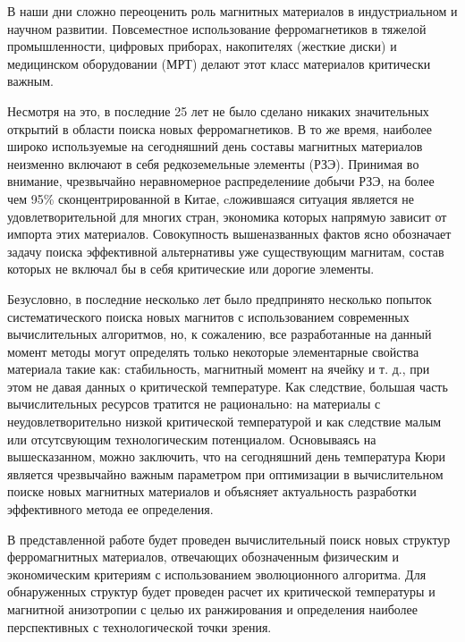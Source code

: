 В наши дни сложно переоценить роль магнитных материалов в индустриальном и научном развитии. Повсеместное использование ферромагнетиков в тяжелой промышленности, цифровых приборах, накопителях (жесткие диски) и медицинском оборудовании (МРТ) делают этот класс материалов критически важным.

Несмотря на это, в последние 25 лет не было сделано никаких значительных открытий в области поиска новых ферромагнетиков. В то же время, наиболее широко используемые на сегодняшний день составы магнитных материалов неизменно включают в себя редкоземельные элементы (РЗЭ).  Принимая во внимание, чрезвычайно неравномерное распределениие добычи РЗЭ,  на более чем 95\% сконцентрированной в Китае, cложившаяся ситуация является не удовлетворительной для многих стран, экономика которых напрямую зависит от импорта этих материалов.
Совокупность вышеназванных фактов ясно обозначает задачу поиска эффективной альтернативы уже существующим магнитам, состав которых не включал бы в себя критические или дорогие элементы.

Безусловно, в последние несколько лет было предпринято несколько попыток систематического поиска новых магнитов с использованием современных вычислительных алгоритмов, но, к сожалению, все разработанные на данный момент методы могут определять только некоторые элементарные свойства материала такие как: стабильность, магнитный момент на ячейку и т. д., при этом не давая данных о критической температуре.  Как следствие, большая часть вычислительных ресурсов тратится не рационально: на материалы с неудовлетворительно низкой критической температурой и как следствие малым или отсутсвующим технологическим потенциалом. Основываясь на вышесказанном, можно заключить, что на сегодняшний день температура Кюри является чрезвычайно важным параметром при оптимизации в вычислительном поиске новых магнитных материалов и объясняет актуальность разработки эффективного метода ее определения.

В представленной работе будет проведен вычислительный поиск новых структур ферромагнитных материалов, отвечающих обозначенным физическим и экономическим критериям с использованием эволюционного алгоритма. Для обнаруженных структур будет проведен расчет их критической температуры и магнитной анизотропии с целью их ранжирования и определения наиболее перспективных с технологической точки зрения. 

